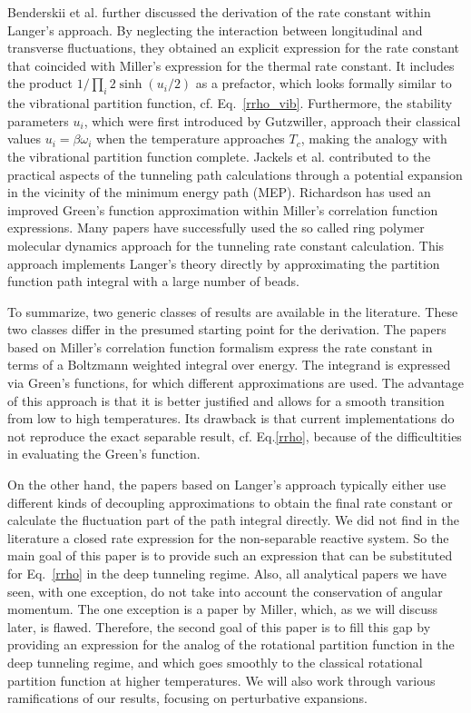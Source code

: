 \documentclass[journal=jpcafh,manuscript=article]{achemso}
\begin{document}
Benderskii et al.\cite{benderskii92,benderskii93} further discussed
the derivation of the rate constant within Langer's approach.  By
neglecting the interaction between longitudinal and transverse
fluctuations, they obtained an explicit expression for the rate
constant that coincided with Miller's expression for the thermal
rate constant.\cite{miller75} It includes the product
$1/\prod_i2\sinh(u_i/2)$ as a prefactor, which looks formally similar
to the vibrational partition function, cf.
Eq.~\ref{rrho_vib}. Furthermore, the stability parameters $u_i$, which
were first introduced by Gutzwiller,\cite{miller75,gutzwiller71}
approach their classical values $u_i=\beta\omega_i$ when the
temperature approaches $T_c$, making the analogy with the vibrational
partition function complete. Jackels et al.\cite{jackels95}
contributed to the practical aspects of the tunneling path
calculations through a potential expansion in the vicinity of the
minimum energy path (MEP).
Richardson\cite{richardson16,richardson16a} has used an improved
Green's function approximation within Miller's correlation function
expressions.\cite{miller83} Many papers have successfully used the so
called ring polymer molecular dynamics approach for the tunneling
rate constant calculation.\cite{beyer16, richardson18} This approach
implements Langer's theory directly by approximating the partition
function path integral with a large number of beads.

To summarize, two generic classes of results are available in the
literature. These two classes differ in the presumed starting point
for the derivation. The papers based on Miller's correlation function
formalism express the rate constant in terms of a Boltzmann weighted
integral over energy. The integrand is expressed via Green's
functions, for which different approximations are used. The advantage
of this approach is that it is better justified and allows for a
smooth transition from low to high temperatures. Its drawback is that
current implementations do not reproduce the exact separable result,
cf. Eq.\ref{rrho}, because of the difficultities in evaluating the
Green's function.

On the other hand, the papers based on Langer's approach typically
either use different kinds of decoupling approximations to obtain the
final rate constant or calculate the fluctuation part of the path
integral directly. We did not find in the literature a closed rate
expression for the non-separable reactive system. So the main goal of
this paper is to provide such an expression that can be substituted
for Eq.~\ref{rrho} in the deep tunneling regime. Also, all analytical
papers we have seen, with one exception, do not take into account the
conservation of angular momentum. The one exception is a paper by
Miller\cite{miller75}, which, as we will discuss later, is
flawed. Therefore, the second goal of this paper is to fill this gap
by providing an expression for the analog of the rotational partition
function in the deep tunneling regime, and which goes smoothly to the
classical rotational partition function at higher temperatures. We
will also work through various ramifications of our results, focusing
on perturbative expansions.
\end{document}
